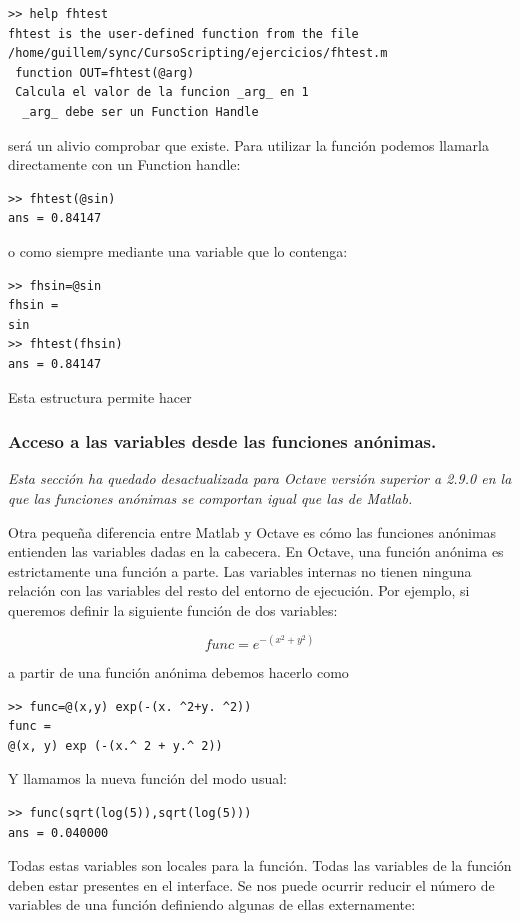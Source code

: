 \begin{lstlisting}
>> help fhtest
fhtest is the user-defined function from the file
/home/guillem/sync/CursoScripting/ejercicios/fhtest.m
 function OUT=fhtest(@arg)
 Calcula el valor de la funcion _arg_ en 1
  _arg_ debe ser un Function Handle
\end{lstlisting}
será un alivio comprobar que existe.  Para utilizar la función podemos
llamarla directamente con un Function handle:

\begin{lstlisting}
>> fhtest(@sin)
ans = 0.84147
\end{lstlisting}
o como siempre mediante una variable que lo contenga:

\begin{lstlisting}
>> fhsin=@sin
fhsin =
sin
>> fhtest(fhsin)
ans = 0.84147
\end{lstlisting}
Esta estructura permite hacer


\subsubsection{Acceso a las variables desde las funciones anónimas.}

\emph{Esta sección ha quedado desactualizada para Octave versión
  superior a 2.9.0 en la que las funciones anónimas se comportan igual
  que las de Matlab.}

Otra pequeña diferencia entre Matlab y Octave es cómo las funciones
anónimas entienden las variables dadas en la cabecera. En Octave, una
función anónima es estrictamente una función a parte. Las variables
internas no tienen ninguna relación con las variables del resto del
entorno de ejecución. Por ejemplo, si queremos definir la siguiente
función de dos variables:

$$func=e^{-(x^{2}+y^{2})}$$

a partir de una función anónima debemos hacerlo como

\begin{lstlisting}
>> func=@(x,y) exp(-(x. ^2+y. ^2)) 
func =
@(x, y) exp (-(x.^ 2 + y.^ 2)) 
\end{lstlisting}
Y llamamos la nueva función del modo usual:

\begin{lstlisting}
>> func(sqrt(log(5)),sqrt(log(5)))
ans = 0.040000 
\end{lstlisting}
Todas estas variables son locales para la función. Todas las variables
de la función deben estar presentes en el interface. Se nos puede
ocurrir reducir el número de variables de una función definiendo
algunas de ellas externamente:

